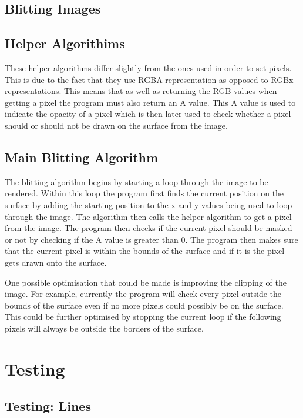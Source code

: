 \documentclass[
	letterpaper, %
	10pt, %
]{CSUniSchoolLabReport}
\begin{document}
\subsection{Blitting Images}
\subsection*{Helper Algorithims}
\begin{flushleft}
	These helper algorithms differ slightly from the ones used in order to set pixels. This is due to the fact that
	they use RGBA representation as opposed to RGBx representations. This means that as well as returning the RGB values
	when getting a pixel the program must also return an A value. This A value is used to indicate the opacity of a pixel 
	which is then later used to check whether a pixel should or should not be drawn on the surface from the image.
\end{flushleft}
\subsection*{Main Blitting Algorithm}
\begin{flushleft}
	The blitting algorithm begins by starting a loop through the image to be rendered. Within this loop 
	the program first finds the current position on the surface by adding the starting position to the x and y
	values being used to loop through the image. The algorithm then calls the helper algorithm to get a pixel from the image.
	The program then checks if the current pixel should be masked or not by checking if the A value is greater than 0. The program
	then makes sure that the current pixel is within the bounds of the surface and if it is the pixel gets drawn onto the surface.
\end{flushleft}
\begin{flushleft}
	One possible optimisation that could be made is improving the clipping of the image. For example, currently the program will check every 
	pixel outside the bounds of the surface even if no more pixels could possibly be on the surface. This could be further optimised
	by stopping the current loop if the following pixels will always be outside the borders of the surface.
\end{flushleft}
\section{Testing}
\subsection{Testing: Lines}
\end{document}

